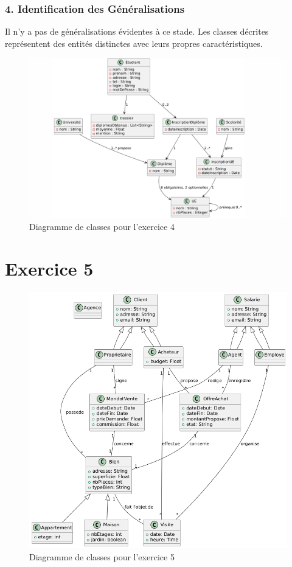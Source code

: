 \documentclass{article}
\begin{document}
\subsubsection*{4. Identification des Généralisations}

Il n’y a pas de généralisations évidentes à ce stade. Les classes décrites représentent des entités distinctes avec leurs propres caractéristiques.

\begin{figure}[H]
  \centering
  \includegraphics[width=\textwidth]{exo4.png}
  \caption{Diagramme de classes pour l'exercice 4}
\end{figure}

\section*{Exercice 5}

\begin{figure}[H]
  \centering
  \includegraphics[width=\textwidth]{exo5.png}
  \caption{Diagramme de classes pour l'exercice 5}
\end{figure}
\end{document}
